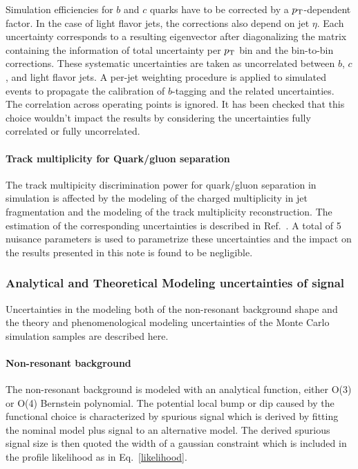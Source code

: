 Simulation efficiencies for $b$ and $c$ quarks have to be corrected by a
$p_{{\rm T}}$-dependent factor. In the case of light flavor jets, the corrections also 
depend on jet $\eta$. 
Each uncertainty corresponds to a resulting eigenvector after diagonalizing the matrix
containing the information of total uncertainty per $p_{{\rm T}}$ bin and the bin-to-bin 
corrections. These systematic
uncertainties are taken as uncorrelated between $b$, $c$, and light flavor jets.
A per-jet weighting procedure is applied to simulated events to propagate the 
calibration of $b$-tagging and the related uncertainties. 
The correlation across operating points is ignored. It has been checked that this choice
wouldn't impact the results by considering the uncertainties fully correlated or fully uncorrelated.


\paragraph{Track multiplicity for Quark/gluon separation}

The track multipicity discrimination power for quark/gluon separation in simulation 
is affected by the modeling of the charged multiplicity in jet fragmentation and the modeling of the
track multiplicity reconstruction. The estimation of the corresponding uncertainties is 
described in Ref.~\cite{qgtagging}. A total of 5 nuisance parameters is used to parametrize these
uncertainties and the impact on the results presented in this note is found to be negligible.

\subsubsection{Analytical and Theoretical Modeling uncertainties of signal}
\label{sec:vbf-syst_model}

Uncertainties in the modeling both of the non-resonant background shape and the theory and phenomenological modeling uncertainties of the Monte Carlo simulation samples are described here.


\paragraph{Non-resonant background}
The non-resonant background is modeled with an analytical function, either O(3) or O(4) Bernstein polynomial. 
The potential local bump or dip caused by the functional choice is characterized by spurious signal 
which is derived by fitting the nominal model plus signal to an alternative model. The derived spurious signal 
size is then quoted the width of a gaussian constraint which is included in the profile likelihood as in 
Eq.~\ref{likelihood}.

